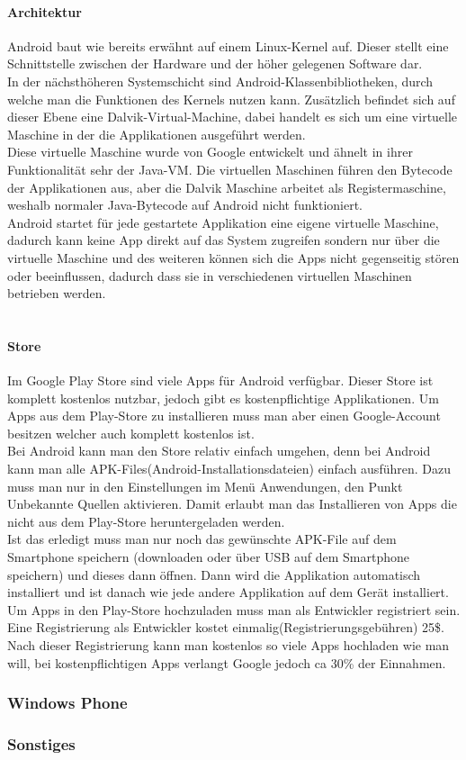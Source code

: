 \paragraph*{Architektur\\}
Android baut wie bereits erwähnt auf einem Linux-Kernel auf.  Dieser stellt eine Schnittstelle zwischen der Hardware und der höher gelegenen Software dar.\\
In der nächsthöheren Systemschicht sind Android-Klassenbibliotheken, durch welche man die Funktionen des Kernels nutzen kann. Zusätzlich befindet sich auf dieser Ebene eine Dalvik-Virtual-Machine, dabei handelt es sich um eine virtuelle Maschine in der die Applikationen ausgeführt werden.\\
Diese virtuelle Maschine wurde von Google entwickelt und ähnelt in ihrer Funktionalität sehr der Java-VM. Die virtuellen Maschinen führen den Bytecode der Applikationen aus, aber die Dalvik Maschine arbeitet als Registermaschine, weshalb normaler Java-Bytecode auf Android nicht funktioniert.\\
Android startet für jede gestartete Applikation eine eigene virtuelle Maschine, dadurch kann keine App direkt auf das System zugreifen sondern nur über die virtuelle Maschine und des weiteren können sich die Apps nicht gegenseitig stören oder beeinflussen, dadurch dass sie in verschiedenen virtuellen Maschinen betrieben werden.\\
\\
\paragraph*{Store\\}
Im Google Play Store sind viele Apps für Android verfügbar. Dieser Store ist komplett kostenlos nutzbar, jedoch gibt es kostenpflichtige Applikationen. Um Apps aus dem Play-Store zu installieren muss man aber einen Google-Account besitzen welcher auch komplett kostenlos ist.\\
Bei Android kann man den Store relativ einfach umgehen, denn bei Android kann man alle APK-Files(Android-Installationsdateien) einfach ausführen. Dazu muss man nur in den Einstellungen im Menü Anwendungen, den Punkt Unbekannte Quellen aktivieren. Damit erlaubt man das Installieren von Apps die nicht aus dem Play-Store heruntergeladen werden.\\
Ist das erledigt muss man nur noch das gewünschte APK-File auf dem Smartphone speichern (downloaden oder über USB auf dem Smartphone speichern) und dieses dann öffnen. Dann wird die Applikation automatisch installiert und ist danach wie jede andere Applikation auf dem Gerät installiert.\\
 Um Apps in den Play-Store hochzuladen muss man als Entwickler registriert sein. Eine Registrierung als Entwickler kostet einmalig(Registrierungsgebühren) 25\$. Nach dieser Registrierung kann man kostenlos so viele Apps hochladen wie man will, bei kostenpflichtigen Apps verlangt Google jedoch ca 30\% der Einnahmen.\\



\subsubsection{Windows Phone}

\subsubsection{Sonstiges}
